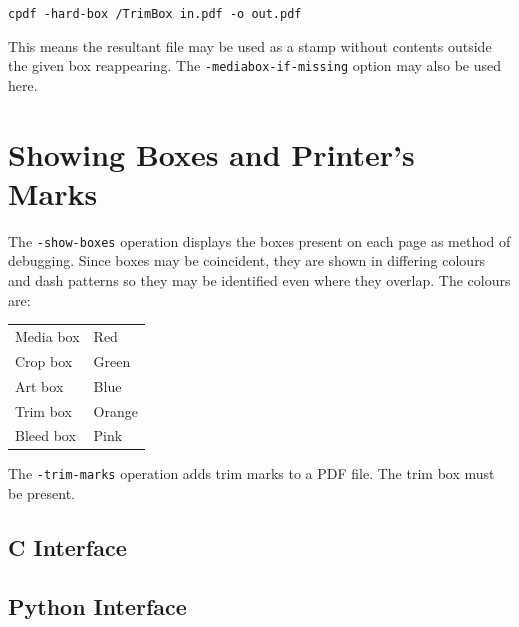\documentclass{book}
\begin{document}
  \begin{framed}
    \noindent\small\verb!cpdf -hard-box /TrimBox in.pdf -o out.pdf!
  \end{framed}

\noindent This means the resultant file may be used as a stamp without contents outside the given box reappearing. The \texttt{-mediabox-if-missing} option may also be used here.

\section{Showing Boxes and Printer's Marks}

The \texttt{-show-boxes} operation displays the boxes present on each page as method of debugging. Since boxes may be coincident, they are shown in differing colours and dash patterns so they may be identified even where they overlap. The colours are:

\medskip
\begin{tabular}{ll}
Media box & Red \\
Crop box & Green \\
Art box & Blue \\
Trim box & Orange \\
Bleed box & Pink 
\end{tabular}
\medskip

\noindent  The \texttt{-trim-marks} operation adds trim marks to a PDF file. The trim box must be present.
\thispagestyle{fancy}

\begin{cpdflib}
\clearpage
\section*{C Interface}
\begin{small}\tt

\end{small}
\end{cpdflib}

\begin{pycpdflib}
\clearpage
\section*{Python Interface}
\begin{small}\tt

\end{small}
\end{pycpdflib}
\end{document}
